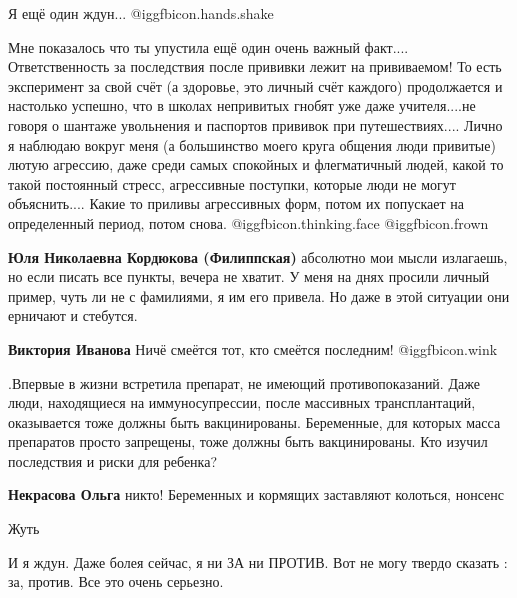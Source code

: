 \begin{itemize}
\begin{itemize}
\end{itemize} %


Я ещё один ждун...  @igg{fbicon.hands.shake} 

Мне показалось что ты упустила ещё один очень важный факт.... Ответственность
за последствия после прививки лежит на прививаемом! То есть эксперимент за свой
счёт (а здоровье, это личный счёт каждого) продолжается и настолько успешно,
что в школах непривитых гнобят уже даже учителя....не говоря о шантаже
увольнения и паспортов прививок при путешествиях.... Лично я наблюдаю вокруг
меня (а большинство моего круга общения люди привитые) лютую агрессию, даже
среди самых спокойных и флегматичный людей, какой то такой постоянный стресс,
агрессивные поступки, которые люди не могут объяснить.... Какие то приливы
агрессивных форм, потом их попускает на определенный период, потом снова.  @igg{fbicon.thinking.face}  @igg{fbicon.frown} 

\begin{itemize} %
\textbf{Юля Николаевна Кордюкова (Филиппская)} абсолютно мои мысли излагаешь, но если писать все пункты, вечера не хватит. У меня на днях просили личный пример, чуть ли не с фамилиями, я им его привела. Но даже в этой ситуации они ерничают и стебутся.

\textbf{Виктория Иванова} Ничё смеётся тот, кто смеётся последним!  @igg{fbicon.wink} 
\end{itemize} %


.Впервые в жизни встретила препарат, не имеющий противопоказаний. Даже
люди, находящиеся на иммуносупрессии, после массивных трансплантаций, оказывается
тоже должны быть вакцинированы. Беременные, для которых масса препаратов просто
запрещены, тоже должны быть вакцинированы. Кто изучил последствия и риски для
ребенка?

\begin{itemize} %
\textbf{Некрасова Ольга} никто! Беременных и кормящих заставляют колоться, нонсенс

Жуть
\end{itemize} %


И я ждун. Даже болея сейчас, я ни ЗА ни ПРОТИВ. Вот не могу твердо сказать :
за, против. Все это очень серьезно.


\end{itemize}
